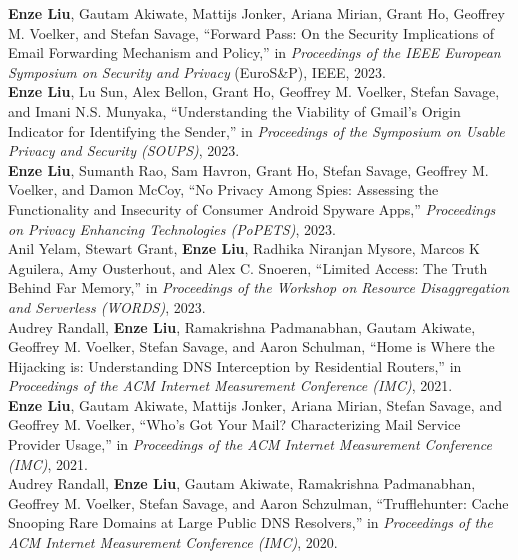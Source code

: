 \documentclass[12pt]{ucsddissertation}
\begin{document}
\begin{vita}
\noindent \textbf{Enze Liu}, Gautam Akiwate, Mattijs Jonker, Ariana Mirian, Grant Ho, Geoffrey M. Voelker, and Stefan Savage, ``Forward Pass: On the Security Implications of Email Forwarding Mechanism and Policy,'' in \textit{Proceedings of the IEEE European Symposium on Security and Privacy} (EuroS\&P), IEEE, 2023.\\

\noindent \textbf{Enze Liu}, Lu Sun, Alex Bellon, Grant Ho, Geoffrey M. Voelker, Stefan Savage, and Imani N.S. Munyaka, ``Understanding the Viability of Gmail's Origin Indicator for Identifying the Sender,'' in \textit{Proceedings of the Symposium on Usable Privacy and Security (SOUPS)}, 2023.\\

\noindent \textbf{Enze Liu}, Sumanth Rao, Sam Havron, Grant Ho, Stefan Savage, Geoffrey M. Voelker, and Damon McCoy, ``No Privacy Among Spies: Assessing the Functionality and Insecurity of Consumer Android Spyware Apps,'' \textit{Proceedings on Privacy Enhancing Technologies (PoPETS)}, 2023.\\

\noindent Anil Yelam, Stewart Grant, \textbf{Enze Liu}, Radhika Niranjan Mysore, Marcos K Aguilera, Amy Ousterhout, and Alex C. Snoeren, ``Limited Access: The Truth Behind Far Memory,'' in \textit{Proceedings of the
Workshop on Resource Disaggregation and Serverless (WORDS)}, 2023.\\

\noindent Audrey Randall, \textbf{Enze Liu}, Ramakrishna Padmanabhan, Gautam Akiwate, Geoffrey M. Voelker, Stefan Savage, and Aaron Schulman, ``Home is Where the Hijacking is: Understanding DNS Interception by Residential Routers,'' in \textit{Proceedings of the ACM Internet Measurement Conference (IMC)}, 2021.\\

\noindent \textbf{Enze Liu}, Gautam Akiwate, Mattijs Jonker, Ariana Mirian, Stefan Savage, and Geoffrey M. Voelker, ``Who's Got Your Mail? Characterizing Mail Service Provider Usage,'' in \textit{Proceedings of the ACM Internet Measurement Conference (IMC)}, 2021.\\

\noindent Audrey Randall, \textbf{Enze Liu}, Gautam Akiwate, Ramakrishna Padmanabhan, Geoffrey M. Voelker, Stefan Savage, and Aaron Schzulman, ``Trufflehunter: Cache Snooping Rare Domains at Large Public DNS Resolvers,'' in \textit{Proceedings of the ACM Internet Measurement Conference (IMC)}, 2020.\\ 


\end{vita}
\end{document}
